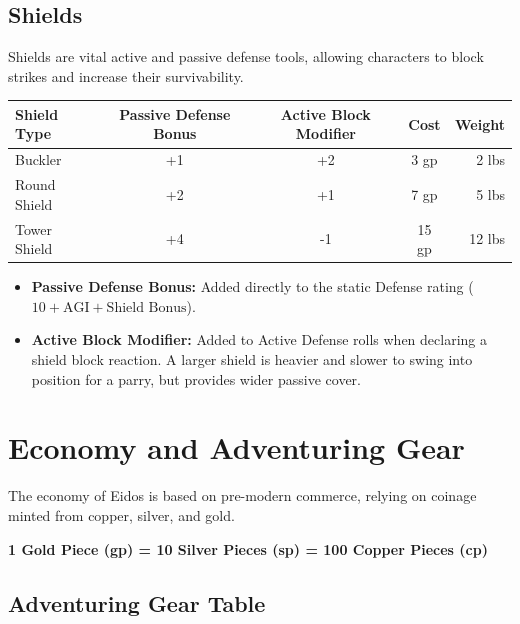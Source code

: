 \subsection{Shields}

Shields are vital active and passive defense tools, allowing characters to block strikes and increase their survivability.

\begin{center}
\begin{tabular}{lcccr}
\hline
\textbf{Shield Type} & \textbf{Passive Defense Bonus} & \textbf{Active Block Modifier} & \textbf{Cost} & \textbf{Weight} \\ \hline
Buckler & +1 & +2 & 3 gp & 2 lbs \\
Round Shield & +2 & +1 & 7 gp & 5 lbs \\
Tower Shield & +4 & -1 & 15 gp & 12 lbs \\ \hline
\end{tabular}
\end{center}

\begin{itemize}
    \item \textbf{Passive Defense Bonus:} Added directly to the static Defense rating ($10 + \text{AGI} + \text{Shield Bonus}$).
    \item \textbf{Active Block Modifier:} Added to Active Defense rolls when declaring a shield block reaction. A larger shield is heavier and slower to swing into position for a parry, but provides wider passive cover.
\end{itemize}

\section{Economy and Adventuring Gear}

The economy of Eidos is based on pre-modern commerce, relying on coinage minted from copper, silver, and gold.

\begin{center}
    \textbf{1 Gold Piece (gp) = 10 Silver Pieces (sp) = 100 Copper Pieces (cp)}
\end{center}

\subsection{Adventuring Gear Table}

